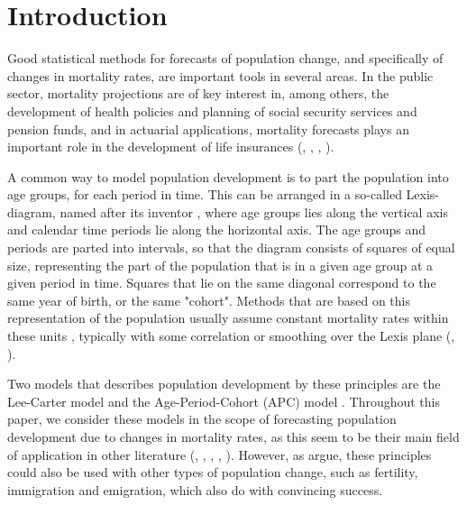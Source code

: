 \section{Introduction}

Good statistical methods for forecasts of population change, and specifically of changes in mortality rates, are important tools in several areas. In the public sector, mortality projections are of key interest in, among others, the development of health policies and planning of social security services and pension funds, and in actuarial applications, mortality forecasts plays an important role in the development of life insurances (\textcite{BROUHNS2002373}, \textcite{RENSHAW2006556}, \textcite{CZADO2005260}, \textcite{LeeCarter1992}). 

\newpar A common way to model population development is to part the population into age groups, for each period in time. This can be arranged in a so-called Lexis-diagram, named after its inventor \parencite{CZADO2005260}, where age groups lies along the vertical axis and calendar time periods lie along the horizontal axis. The age groups and periods are parted into intervals, so that the diagram consists of squares of equal size, representing the part of the population that is in a given age group at a given period in time. Squares that lie on the same diagonal correspond to the same year of birth, or the same "cohort". Methods that are based on this representation of the population usually assume constant mortality rates within these units \parencite{CZADO2005260}, typically with some correlation or smoothing over the Lexis plane (\textcite{CZADO2005260}, \textcite{RieblerThesis2010}). 

\newpar Two models that describes population development by these principles are the Lee-Carter model \parencite{LeeCarter1992} and the Age-Period-Cohort (APC) model \parencite{Clayton1987}. Throughout this paper, we consider these models in the scope of forecasting population development due to changes in mortality rates, as this seem to be their main field of application in other literature (\textcite{LeeCarter1992}, \textcite{RieblerThesis2010}, \textcite{CZADO2005260}, \textcite{BROUHNS2002373}, \textcite{RENSHAW2006556}). However, as \textcite{Wisniowski2015} argue, these principles could also be used with other types of population change, such as fertility, immigration and emigration, which \textcite{Wisniowski2015} also do with convincing success. 

